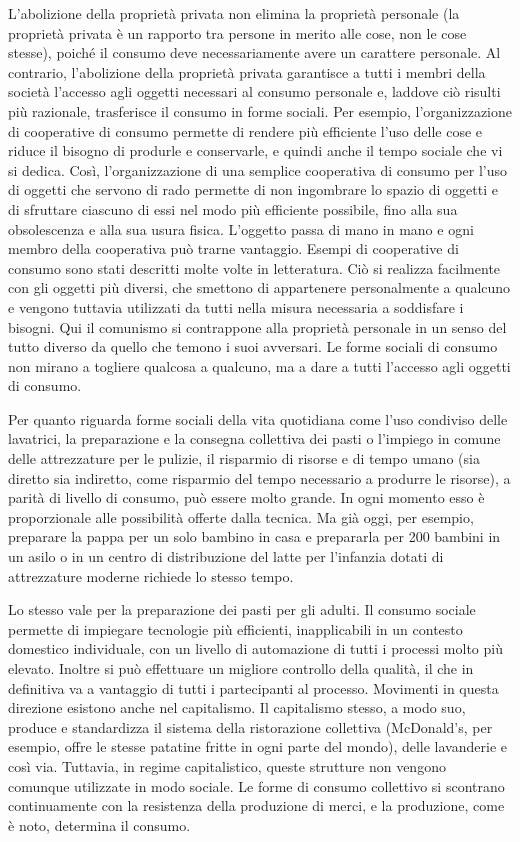 \documentclass[../main]{subfiles}
\begin{document}
L'abolizione della proprietà privata non elimina la proprietà personale (la proprietà privata è un rapporto tra persone in merito alle cose, non le cose stesse), poiché il consumo deve necessariamente avere un carattere personale. Al contrario, l'abolizione della proprietà privata garantisce a tutti i membri della società l'accesso agli oggetti necessari al consumo personale e, laddove ciò risulti più razionale, trasferisce il consumo in forme sociali. Per esempio, l'organizzazione di cooperative di consumo permette di rendere più efficiente l'uso delle cose e riduce il bisogno di produrle e conservarle, e quindi anche il tempo sociale che vi si dedica. Così, l'organizzazione di una semplice cooperativa di consumo per l'uso di oggetti che servono di rado permette di non ingombrare lo spazio di oggetti e di sfruttare ciascuno di essi nel modo più efficiente possibile, fino alla sua obsolescenza e alla sua usura fisica. L'oggetto passa di mano in mano e ogni membro della cooperativa può trarne vantaggio. Esempi di cooperative di consumo sono stati descritti molte volte in letteratura. Ciò si realizza facilmente con gli oggetti più diversi, che smettono di appartenere personalmente a qualcuno e vengono tuttavia utilizzati da tutti nella misura necessaria a soddisfare i bisogni. Qui il comunismo si contrappone alla proprietà personale in un senso del tutto diverso da quello che temono i suoi avversari. Le forme sociali di consumo non mirano a togliere qualcosa a qualcuno, ma a dare a tutti l'accesso agli oggetti di consumo.

Per quanto riguarda forme sociali della vita quotidiana come l'uso condiviso delle lavatrici, la preparazione e la consegna collettiva dei pasti o l'impiego in comune delle attrezzature per le pulizie, il risparmio di risorse e di tempo umano (sia diretto sia indiretto, come risparmio del tempo necessario a produrre le risorse), a parità di livello di consumo, può essere molto grande. In ogni momento esso è proporzionale alle possibilità offerte dalla tecnica. Ma già oggi, per esempio, preparare la pappa per un solo bambino in casa e prepararla per 200 bambini in un asilo o in un centro di distribuzione del latte per l'infanzia dotati di attrezzature moderne richiede lo stesso tempo.

Lo stesso vale per la preparazione dei pasti per gli adulti. Il consumo sociale permette di impiegare tecnologie più efficienti, inapplicabili in un contesto domestico individuale, con un livello di automazione di tutti i processi molto più elevato. Inoltre si può effettuare un migliore controllo della qualità, il che in definitiva va a vantaggio di tutti i partecipanti al processo. Movimenti in questa direzione esistono anche nel capitalismo. Il capitalismo stesso, a modo suo, produce e standardizza il sistema della ristorazione collettiva (McDonald's, per esempio, offre le stesse patatine fritte in ogni parte del mondo), delle lavanderie e così via. Tuttavia, in regime capitalistico, queste strutture non vengono comunque utilizzate in modo sociale. Le forme di consumo collettivo si scontrano continuamente con la resistenza della produzione di merci, e la produzione, come è noto, determina il consumo.
\end{document}
